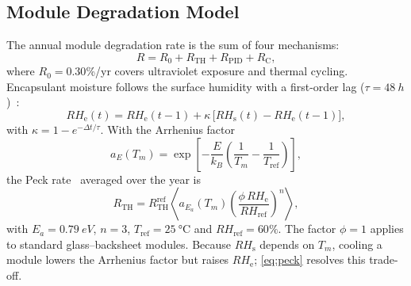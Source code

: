 \documentclass[journal]{IEEEtran}
\newcommand{\RHs}{\mathit{RH}_{\mathrm{s}}}
\newcommand{\RHe}{\mathit{RH}_{\mathrm{e}}}
\begin{document}
\subsection{Module Degradation Model}
The annual module degradation rate is the sum of four mechanisms:
\begin{equation}
R = R_0 + R_{\mathrm{TH}} + R_{\mathrm{PID}} + R_{\mathrm{C}},
\label{eq:R}
\end{equation}
where $R_0=0.30$\%/yr covers ultraviolet exposure and thermal cycling. Encapsulant moisture follows the surface
humidity with a first-order lag ($\tau=\SI{48}{h}$)~\cite{kempe2006}:
\begin{equation}
\RHe(t) = \RHe(t-1) + \kappa\,\bigl[\RHs(t)-\RHe(t-1)\bigr],
\label{eq:rhe}
\end{equation}
with $\kappa = 1-e^{-\Delta t/\tau}$. With the Arrhenius factor
\begin{equation}
a_E(T_m) = \exp\!\left[-\frac{E}{k_B}\left(\frac{1}{T_m}-\frac{1}{T_{\mathrm{ref}}}\right)\right],
\label{eq:arr}
\end{equation}
the Peck rate~\cite{peck1986} averaged over the year is
\begin{equation}
R_{\mathrm{TH}} = R_{\mathrm{TH}}^{\mathrm{ref}}\left\langle a_{E_a}(T_m)
\left(\frac{\phi\,\RHe}{\mathit{RH}_{\mathrm{ref}}}\right)^{n}\right\rangle,
\label{eq:peck}
\end{equation}
with $E_a=\SI{0.79}{eV}$, $n=3$, $T_{\mathrm{ref}}=\SI{25}{\celsius}$ and $\mathit{RH}_{\mathrm{ref}}=60\%$. The factor
$\phi=1$ applies to standard glass--backsheet modules. Because $\RHs$ depends on $T_m$, cooling a module lowers the
Arrhenius factor but raises $\RHe$; \eqref{eq:peck} resolves this trade-off.
\end{document}
